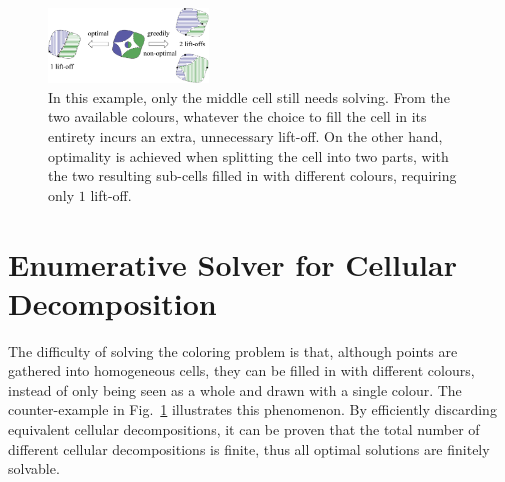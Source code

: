 \documentclass[journal]{IEEEtran}
\begin{document}
\begin{figure}[t]
\centering
\includegraphics[width = 0.38\textwidth]{figures/other_figures/simple_3}
\caption{
In this example, only the middle cell still needs solving. From the two available colours, whatever the choice to fill the cell in its entirety incurs an extra, unnecessary lift-off. On the other hand, optimality is achieved when splitting the cell into two parts, 
with the two resulting sub-cells filled in with different colours, requiring only $1$ lift-off. 
}\label{figsimpleexample}
\end{figure}

\section{Enumerative Solver for Cellular Decomposition}
\label{sectionenumerativesolver}
The difficulty of solving the coloring problem is that, although points are gathered into homogeneous cells, 
they can be filled in with different colours, instead of only being seen as a whole and drawn with a single colour. 
The counter-example in Fig.~\ref{figsimpleexample} illustrates this phenomenon. 
By efficiently discarding equivalent cellular decompositions, it can be proven that the total number of different cellular 
decompositions is finite, thus all optimal solutions are finitely solvable. 
\end{document}
